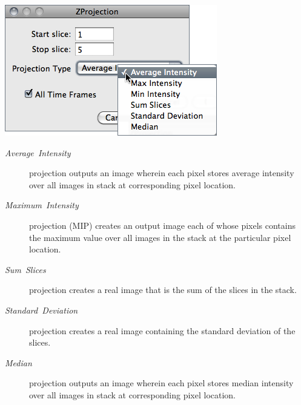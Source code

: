 \begin{minipage}[c][1\totalheight][t]{0.485\columnwidth}%
\includegraphics[scale=0.55]{images/Zproject}%
\end{minipage}%
\begin{minipage}[c][1\totalheight][t]{0.515\columnwidth}%
\begin{description}
\item [{\emph{Average\ Intensity}}] projection outputs an image wherein
each pixel stores average intensity over all images in stack at corresponding
pixel location.
\item [{\emph{Maximum\ Intensity}}] projection (MIP)
creates an output image each of
whose pixels contains the maximum value over all images in the stack
at the particular pixel location.\end{description}
%
\end{minipage}
\begin{description}
\item [{\emph{Sum\ Slices}}] projection creates a real image that is the
sum of the slices in the stack. 
\item [{\emph{Standard\ Deviation}}] projection creates a real image containing
the standard deviation of the slices.
\item [{\emph{Median}}] projection outputs an image wherein each pixel
stores median intensity over all images in stack at corresponding
pixel location.
\end{description}



\subsubsection[\protect\userinterface{3D Project\ldots{}}]{\protect{}\label{sub:3D-Project...}\improvement{}}

